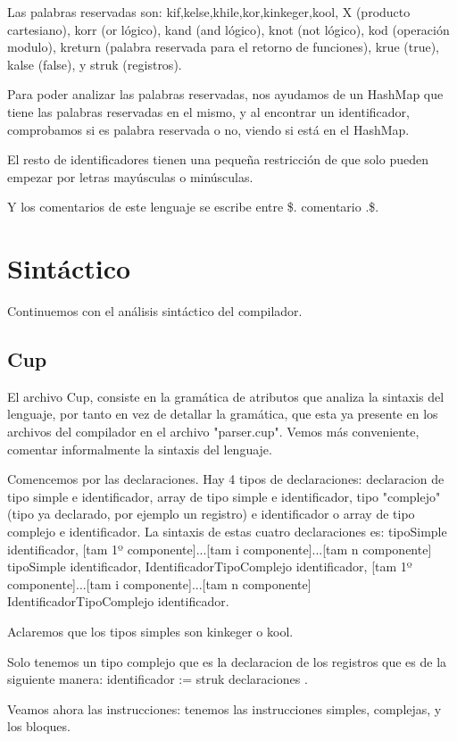 \documentclass[a4paper, 11pt, twoside, openany, onecolumn, final]{memoir}
\begin{document}
	Las palabras reservadas son: kif,kelse,khile,kor,kinkeger,kool, X (producto cartesiano), korr (or lógico), kand (and lógico), knot (not lógico), kod (operación modulo), kreturn (palabra reservada para el retorno de funciones), krue (true), kalse (false), y struk (registros).
	
	Para poder analizar las palabras reservadas, nos ayudamos de un HashMap que tiene las palabras reservadas en el mismo, y al encontrar un identificador, comprobamos si es palabra reservada o no, viendo si está en el HashMap.
	
	El resto de identificadores tienen una pequeña restricción de que solo pueden empezar por letras mayúsculas o minúsculas.
	
	Y los comentarios de este lenguaje se escribe entre \$. comentario .\$.
	
	\section{Sintáctico}
	Continuemos con el análisis sintáctico del compilador.
	\subsection{Cup}
	El archivo Cup, consiste en la gramática de atributos que analiza la sintaxis del lenguaje, por tanto en vez de detallar la gramática, que esta ya presente en los archivos del compilador en el archivo "parser.cup". Vemos más conveniente, comentar informalmente la sintaxis del lenguaje.
	
	Comencemos por las declaraciones. Hay 4 tipos de declaraciones: declaracion de tipo simple e identificador, array de tipo simple e identificador, tipo "complejo" (tipo ya declarado, por ejemplo un registro) e identificador o array de tipo complejo e identificador.
	La sintaxis de estas cuatro declaraciones es:
	tipoSimple identificador, [tam 1º componente]...[tam i componente]...[tam n componente] tipoSimple identificador, IdentificadorTipoComplejo identificador, [tam 1º componente]...[tam i componente]...[tam n componente] IdentificadorTipoComplejo identificador. 

	Aclaremos que los tipos simples son kinkeger o kool.	
	
	Solo tenemos un tipo complejo que es la declaracion de los registros que es de la siguiente manera: identificador := struk { declaraciones }.
	
	Veamos ahora las instrucciones: tenemos las instrucciones simples, complejas, y los bloques.
	
\end{document}
